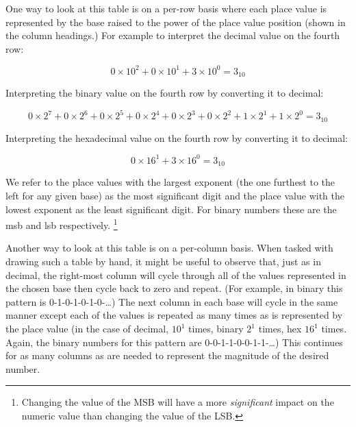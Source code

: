One way to look at this table is on a per-row basis where each place 
value is represented by the base raised to the power of the place value
position (shown in the column headings.)  
For example to interpret the decimal value on the fourth row: 

\begin{equation}
0 \times 10^2 + 0 \times 10^1 + 3 \times 10^0 = 3_{10}
\end{equation}

Interpreting the binary value on the fourth row by converting it to decimal:

\begin{equation}
0 \times 2^7 + 0 \times 2^6 +0 \times 2^5 +0 \times 2^4 +0 \times 2^3 +0 \times 2^2 + 1 \times 2^1 + 1 \times 2^0 = 3_{10}
\end{equation}

Interpreting the hexadecimal value on the fourth row by converting it to decimal:

\begin{equation}
0 \times 16^1 + 3 \times 16^0 = 3_{10}
\end{equation}

%
%
We refer to the place values with the largest exponent (the one furthest to the 
left for any given base) as the most significant digit and the place value
with the lowest exponent as the least significant digit.  For binary
numbers these are the \acrfull{msb} and \acrfull{lsb} respectively.%
\footnote{Changing the value of the MSB will have a more {\em significant}
impact on the numeric value than changing the value of the LSB.} 


Another way to look at this table is on a per-column basis.  When
tasked with drawing such a table by hand, it might be useful 
to observe that, just as in decimal, the right-most column will
cycle through all of the values represented in the chosen base
then cycle back to zero and repeat.  (For example, in binary this
pattern is 0-1-0-1-0-1-0-\ldots) The next column in each base
will cycle in the same manner except each of the values is repeated
as many times as is represented by the place value (in the case of 
decimal, $10^1$ times, binary $2^1$ times, hex $16^1$ times.  Again,
the binary numbers for this pattern are 0-0-1-1-0-0-1-1-\ldots)
This continues for as many columns as are needed to represent the 
magnitude of the desired number.


